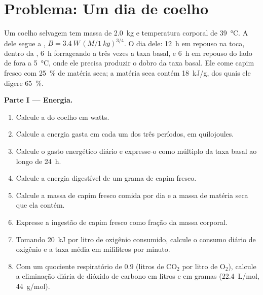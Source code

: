 \section{Problema: Um dia de coelho}

\begin{problem}
\label{pb:b1:mammal-organization:1}
Um coelho selvagem tem massa de \qty{2.0}{kg} e temperatura corporal de
\qty{39}{\celsius}. A  dele segue a ,
$B = \qty{3.4}{W}\,(M/\qty{1}{kg})^{3/4}$. O dia dele: \qty{12}{h} em
repouso na toca, dentro da , \qty{6}{h}
forrageando a três vezes a taxa basal, e \qty{6}{h} em repouso do lado
de fora a \qty{5}{\celsius}, onde ele precisa produzir o dobro da taxa
basal. Ele come capim fresco com \qty{25}{\%} de matéria seca; a matéria
seca contém \qty{18}{kJ/g}, dos quais ele digere \qty{65}{\%}.

\medskip
\noindent\textbf{Parte I --- Energia.}
\begin{enumerate}
  \item Calcule a  do coelho em watts.
  \item Calcule a energia gasta em cada um dos três períodos, em
        quilojoules.
  \item Calcule o gasto energético diário e expresse-o como múltiplo da
        taxa basal ao longo de \qty{24}{h}.
  \item Calcule a energia digestível de um grama de capim fresco.
  \item Calcule a massa de capim fresco comida por dia e a massa de
        matéria seca que ela contém.
  \item Expresse a ingestão de capim fresco como fração da massa
        corporal.
  \item Tomando \qty{20}{kJ} por litro de oxigênio consumido, calcule o
        consumo diário de oxigênio e a taxa média em mililitros por
        minuto.
  \item Com um quociente respiratório de $0.9$ (litros de
        $\mathrm{CO_2}$ por litro de $\mathrm{O_2}$), calcule a
        eliminação diária de dióxido de carbono em litros e em gramas
        (\qty{22.4}{L/mol}, \qty{44}{g/mol}).
\end{enumerate}


\end{problem}
